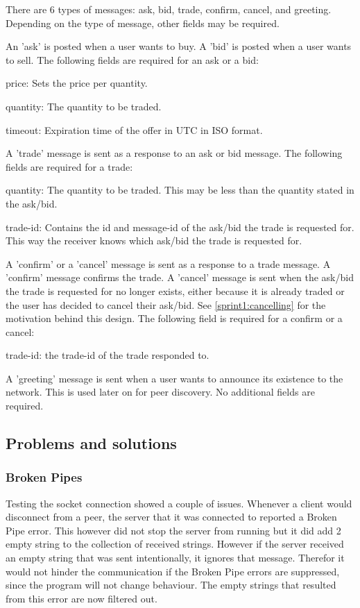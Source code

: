 There are 6 types of messages: ask, bid, trade, confirm, cancel, and greeting.
Depending on the type of message, other fields may be required.

An 'ask' is posted when a user wants to buy.
A 'bid' is posted when a user wants to sell.
The following fields are required for an ask or a bid:
\begin{myitemize}
	\item price: Sets the price per quantity.
	\item quantity: The quantity to be traded.
	\item timeout: Expiration time of the offer in UTC in ISO format.
\end{myitemize}

A 'trade' message is sent as a response to an ask or bid message.
The following fields are required for a trade:
\begin{myitemize}
	\item quantity: The quantity to be traded. This may be less than the quantity stated in the ask/bid.
	\item trade-id: Contains the id and message-id of the ask/bid the trade is requested for. This way the receiver knows which ask/bid the trade is requested for.
\end{myitemize}

A 'confirm' or a 'cancel' message is sent as a response to a trade message.
A 'confirm' message confirms the trade.
A 'cancel' message is sent when the ask/bid the trade is requested for no longer exists, either because it is already traded or the user has decided to cancel their ask/bid.
See \ref{sprint1:cancelling} for the motivation behind this design.
The following field is required for a confirm or a cancel:
\begin{myitemize}
\item trade-id: the trade-id of the trade responded to.
\end{myitemize}

A 'greeting' message is sent when a user wants to announce its existence to the network.
This is used later on for peer discovery.
No additional fields are required.

\subsection{Problems and solutions}
\subsubsection{Broken Pipes}
Testing the socket connection showed a couple of issues.
Whenever a client would disconnect from a peer, the server that it was connected to reported a Broken Pipe error.
This however did not stop the server from running but it did add 2 empty string to the collection of received strings.
However if the server received an empty string that was sent intentionally, it ignores that message.
Therefor it would not hinder the communication if the Broken Pipe errors are suppressed, since the program will not change behaviour.
The empty strings that resulted from this error are now filtered out.

